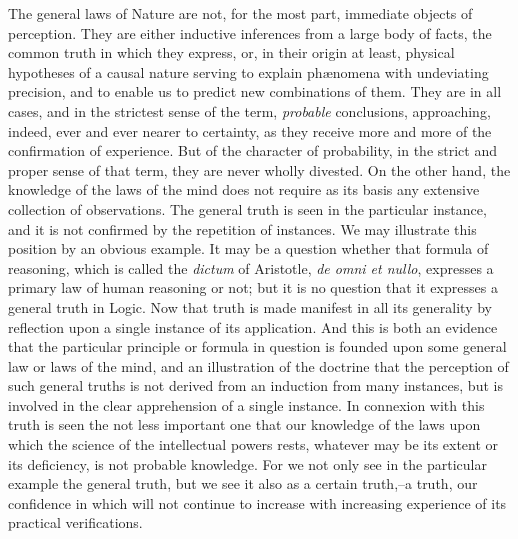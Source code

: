 \documentclass[oneside]{book}
\begin{document}
The general laws of Nature are not, for the most part, immediate
objects of perception. They are either inductive inferences
from a large body of facts, the common truth in which they express,
or, in their origin at least, physical hypotheses of a causal
nature serving to explain ph{\ae}nomena with undeviating precision,
and to enable us to predict new combinations of them. They
are in all cases, and in the strictest sense of the term, \textit{probable}
conclusions, approaching, indeed, ever and ever nearer to certainty,
as they receive more and more of the confirmation of experience.
But of the character of probability, in the strict and
proper sense of that term, they are never wholly divested. On the
other hand, the knowledge of the laws of the mind does not require
as its basis any extensive collection of observations. The general
truth is seen in the particular instance, and it is not confirmed
by the repetition of instances. We may illustrate this position
by an obvious example. It may be a question whether that formula
of reasoning, which is called the \textit{dictum} of Aristotle, \textit{de omni et nullo},
expresses a primary law of human reasoning or not; but
it is no question that it expresses a general truth in Logic. Now
that truth is made manifest in all its generality by reflection
upon a single instance of its application. And this is both an
evidence that the particular principle or formula in question is
founded upon some general law or laws of the mind, and an illustration
of the doctrine that the perception of such general truths
is not derived from an induction from many instances, but is involved
in the clear apprehension of a single instance. In connexion
with this truth is seen the not less important one that
our knowledge of the laws upon which the science of the intellectual
powers rests, whatever may be its extent or its deficiency, is
not probable knowledge. For we not only see in the particular
example the general truth, but we see it also as a certain truth,--a
truth, our confidence in which will not continue to increase
with increasing experience of its practical verifications.
\end{document}

